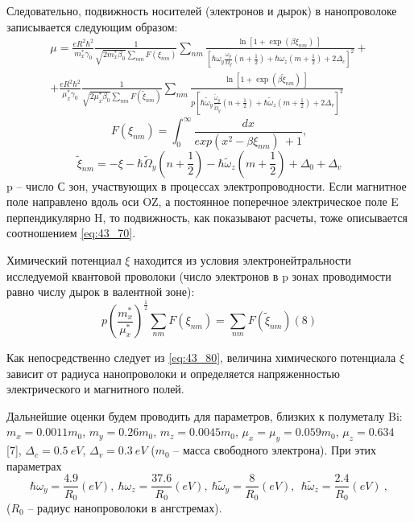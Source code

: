 Следовательно, подвижность носителей (электронов и дырок) в нанопроволоке записывается следующим образом:
\begin{multline} \label{eq:43_70} 
\mu =\frac{eR^2{\hbar }^2}{m^*_x{\gamma }_0}\frac{1}{\sqrt{2m^*_x{\beta }_0}\sum_{nm}{F\left({\xi }_{nm}\right)}}\sum_{nm}{\frac{{\ln \left[1+{\exp \left(\beta {\xi }_{nm}\right)\ }\right]\ }}{{\left[\hbar {\omega }_y\frac{{\omega }_y}{{\Omega }_y}\left(n+\frac{1}{2}\right)+\hbar {\omega }_z\left(m+\frac{1}{2}\right)+2{\Delta }_c\right]}^2}}+\\
+\frac{eR^2{\hbar }^2}{{\mu }^*_x{\gamma }_0}\frac{1}{\sqrt{2{\mu }^*_x{\beta }_0}\sum_{nm}{F\left({\widetilde{\xi }}_{nm}\right)}}\sum_{nm}{\frac{{\ln \left[1+{\exp \left(\beta {\widetilde{\xi }}_{nm}\right)\ }\right]\ }}{p{\left[\hbar {\widetilde{\omega }}_y\frac{{\widetilde{\omega }}_y}{{\widetilde{\Omega }}_y}\left(n+\frac{1}{2}\right)+\hbar {\widetilde{\omega }}_z\left(m+\frac{1}{2}\right)+2{\Delta }_v\right]}^2}} 
\end{multline}
\[
F\left({\xi }_{nm}\right)=\int^{\infty }_0{\frac{dx}{{exp \left(x^2-\beta {\xi }_{nm}\right)\ }+1}},
\]
\[
{\widetilde{\xi }}_{nm}=-\xi -\hbar {\widetilde{\Omega }}_y\left(n+\frac{1}{2}\right)-\hbar {\widetilde{\omega }}_z\left(m+\frac{1}{2}\right)+{\Delta }_0+{\Delta }_v
\]
p -- число С зон, участвующих в процессах электропроводности. Если магнитное поле направлено вдоль оси OZ, а постоянное поперечное электрическое поле E перпендикулярно H, то подвижность, как показывают расчеты, тоже описывается соотношением \eqref{eq:43_70}.

Химический потенциал $\xi $ находится из условия электронейтральности исследуемой квантовой проволоки (число электронов в p зонах проводимости равно числу дырок в валентной зоне):
\begin{equation} \label{eq:43_80} 
p{\left(\frac{m^*_x}{{\mu }^*_x}\right)}^{\frac{1}{2}}\sum_{nm}{F\left({\xi }_{nm}\right)}=\sum_{nm}{F\left({\widetilde{\xi }}_{nm}\right)} (8) 
\end{equation}

Как непосредственно следует из \eqref{eq:43_80}, величина химического потенциала $\xi $ зависит от радиуса нанопроволоки и определяется напряженностью электрического и магнитного полей.

Дальнейшие оценки будем проводить для параметров, близких к полуметалу Bi: $m_x=0.0011m_0$, $m_y=0.26m_0$, $m_z=0.0045m_0$, ${\mu }_x={\mu }_y=0.059m_0$, ${\mu }_z=0.634$ [7], ${\Delta }_c=0.5\ eV$, ${\Delta }_v=0.3\ eV$ ($m_0$ -- масса свободного электрона). При этих параметрах
\[
\hbar {\omega }_y=\frac{4.9}{R_0}\left(eV\right),\ \hbar {\omega }_z=\frac{37.6}{R_0}\left(eV\right),\ \hbar {\widetilde{\omega }}_y=\frac{8}{R_0}\left(eV\right),\ \ \hbar {\widetilde{\omega }}_z=\frac{2.4}{R_0}\left(eV\right)\ ,
\] 
($R_0$ -- радиус нанопроволоки в ангстремах).

